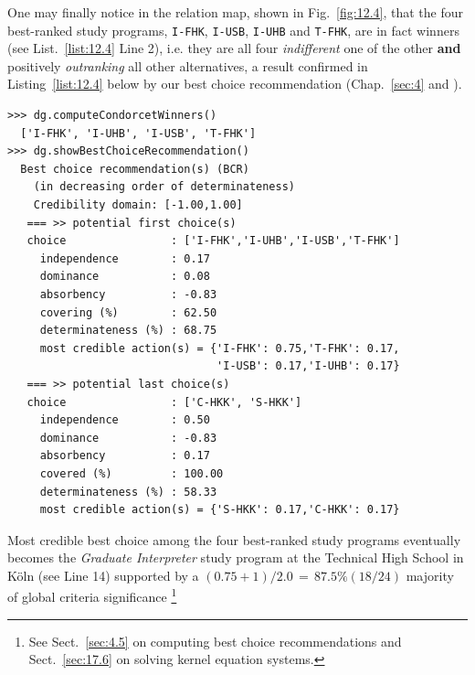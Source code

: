 One may finally notice in the relation map, shown in Fig.~\vref{fig:12.4}, that the four best-ranked study programs, \texttt{I-FHK}, \texttt{I-USB}, \texttt{I-UHB} and \texttt{T-FHK},  are in fact \Condorcet winners (see List.~\vref{list:12.4} Line 2), i.e. they are all four \emph{indifferent} one of the other \textbf{and} positively \emph{outranking} all other alternatives, a result confirmed in Listing~\vref{list:12.4} below by our \Rubis best choice recommendation (Chap.~\ref{sec:4} and \citealp*{BIS-2008a}).
\begin{lstlisting}[caption={Alice's best choice recommendation},label=list:12.4]
>>> dg.computeCondorcetWinners()
  ['I-FHK', 'I-UHB', 'I-USB', 'T-FHK'] 
>>> dg.showBestChoiceRecommendation()
  Best choice recommendation(s) (BCR)
    (in decreasing order of determinateness)   
    Credibility domain: [-1.00,1.00]
   === >> potential first choice(s)
   choice                : ['I-FHK','I-UHB','I-USB','T-FHK']
     independence        : 0.17
     dominance           : 0.08
     absorbency          : -0.83
     covering (%)        : 62.50
     determinateness (%) : 68.75
     most credible action(s) = {'I-FHK': 0.75,'T-FHK': 0.17,
                                'I-USB': 0.17,'I-UHB': 0.17}
   === >> potential last choice(s) 
   choice                : ['C-HKK', 'S-HKK']
     independence        : 0.50
     dominance           : -0.83
     absorbency          : 0.17
     covered (%)         : 100.00
     determinateness (%) : 58.33
     most credible action(s) = {'S-HKK': 0.17,'C-HKK': 0.17}
\end{lstlisting}

Most credible best choice among the four best-ranked study programs eventually becomes the \emph{Graduate Interpreter} study program at the Technical High School in Köln (see Line 14) supported by a $(0.75 + 1)/2.0 \,=\,87.5\% (18/24)$ majority of global criteria significance \footnote{See Sect.~\ref{sec:4.5} on computing best choice recommendations and Sect.~\ref{sec:17.6} on solving kernel equation systems.}

